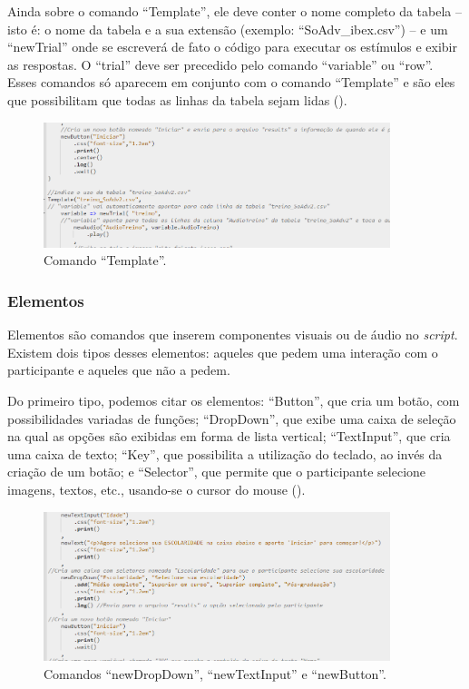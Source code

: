 \documentclass{textolivre}
\begin{document}
Ainda sobre o comando “Template”, ele deve conter o nome completo da tabela – isto é: o nome da tabela e a sua extensão (exemplo: “SoAdv\_ibex.csv”) – e um “newTrial” onde se escreverá de fato o código para executar os estímulos e exibir as respostas. O “trial” deve ser precedido pelo comando “variable” ou “row”. Esses comandos só aparecem em conjunto com o comando “Template” e são eles que possibilitam que todas as linhas da tabela sejam lidas ().

\begin{figure}[htbp]
 \centering
 \includegraphics[width=0.9\textwidth]{fig-012.png}
 \caption{Comando “Template”.}
 \label{fig12}
\end{figure}

\subsubsection{Elementos}
Elementos são comandos que inserem componentes visuais ou de áudio no \emph{script}. Existem dois tipos desses elementos: aqueles que pedem uma interação com o participante e aqueles que não a pedem.

Do primeiro tipo, podemos citar os elementos: “Button”, que cria um botão, com possibilidades variadas de funções; “DropDown”, que exibe uma caixa de seleção na qual as opções são exibidas em forma de lista vertical; “TextInput”, que cria uma caixa de texto; “Key”, que possibilita a utilização do teclado, ao invés da criação de um botão; e “Selector”, que permite que o participante selecione imagens, textos, etc., usando-se o cursor do mouse ().

\begin{figure}[htbp]
 \centering
 \includegraphics[width=0.9\textwidth]{fig-013.png}
 \caption{Comandos “newDropDown”, “newTextInput” e “newButton”.}
 \label{fig13}
\end{figure}
\end{document}
